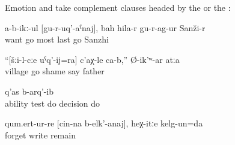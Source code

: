 Emotion and  take complement clauses headed by the  or the :
%
\begin{exe}
	\ex	\label{ex:‎Not wanting to leave, he left Sanzhi as the very last}
	\gll	a-b-ikː-ul	[gu-r-uq'-aˁnaj],	bah	hila-r	gu-r-ag-ur	Sanži-r\\
		want	go	most	last	go	Sanzhi\\
	\glt	{}

	\ex	\label{ex:(I) am ashamed to go to the village, said the father}
	\gll	``[šːi-l-cːe	uˁq'-ij=ra]	c'aχ-le	ca-b,''	Ø-ik'ʷ-ar	atːa\\
		village	go	shame		say	father\\
	\glt	{}

	\ex	\label{ex:They decided to test their ability}
		q'as	b-arq'-ib\\
			ability	test	do	decision	do\\
	\glt	{}

	\ex	\label{ex:‎He forgot to write and I remained like this}
	\gll	qum.ert-ur-re	[cin-na	b-elk'-anaj],	heχ-itːe	kelg-un=da\\
		forget		write		remain\\
	\glt	{}
\end{exe}

